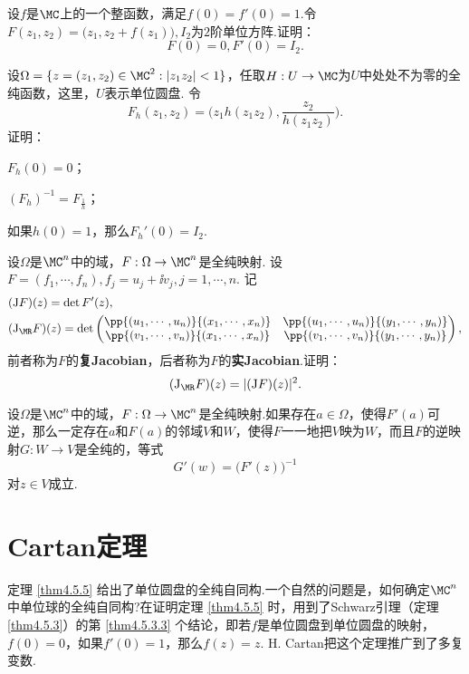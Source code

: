 \begin{xiti}\hypertarget{xiti9.4}{}
\item \hypertarget{xiti9.4.1}{} 设$f$是$\MC$上的一个整函数，满足$f(0)=f'(0)=1$.令$F(z_1,z_2)=\big(z_1,z_2+f(z_1)\big), I_2$为$2$阶单位方阵.证明：
    \[F(0)=0,F'(0)= I_2.\]
\item \hypertarget{xiti9.4.2}{} 设$\Omega=\{z=(z_1,z_2)\in\MC^2:|z_1z_2|<1\}$，任取$H:U\to\MC$为$U$中处处不为零的全纯函数，这里，$U$表示单位圆盘. 令
    \[F_h(z_1,z_2)=\bigg(z_1h(z_1z_2),\frac{z_2}{h(z_1z_2)}\bigg).\]
证明：
\begin{enuma}
   \item $F_h(0)=0$；
   \item $(F_h)^{-1}=F_{\frac1h}$；
   \item 如果$h(0)=1$，那么$F_h'(0)= I_2$.
\end{enuma}
\item 设$\Omega$是$\MC^n$中的域，$F:\Omega\to\MC^n$是全纯映射. 设$F=(f_1,\cdots,f_n),f_j=u_j+\ii v_j,j=1,\cdots,n$. 记
    \begin{align*}
    &(\textrm JF)(z)=\det F'(z),\\
    &(\textrm J_\MR F)(z)=\det\begin{pmatrix}
    \pp{(u_1,\cdots,u_n)}{(x_1,\cdots,x_n)}&\pp{(u_1,\cdots,u_n)}{(y_1,\cdots,y_n)}\\
    \pp{(v_1,\cdots,v_n)}{(x_1,\cdots,x_n)}&\pp{(v_1,\cdots,v_n)}{(y_1,\cdots,y_n)}
    \end{pmatrix},
    \end{align*}
前者称为$F$的\textbf{复Jacobian}，后者称为$F$的\textbf{实Jacobian}.证明：
\[(\textrm J_\MR F)(z)=|(\textrm JF)(z)|^2.\]
\item 设$\Omega$是$\MC^n$中的域，$F:\Omega\to \MC^n$是全纯映射.如果存在$a\in\Omega$，使得$F'(a)$可逆，那么一定存在$a$和$F(a)$的邻域$V$和$W$，使得$F$一一地把$V$映为$W$，而且$F$的逆映射$G:W\to V$是全纯的，等式
    \[G'(w)=\big(F'(z)\big)^{-1}\]
对$z\in V$成立.
\end{xiti}

\section{Cartan定理\label{sec9.5}}
定理 \ref{thm4.5.5} 给出了单位圆盘的全纯自同构.一个自然的问题是，如何确定$\MC^n$中单位球的全纯自同构?在证明定理 \ref{thm4.5.5} 时，用到了Schwarz引理（定理 \ref{thm4.5.3}）的第 \ref{thm4.5.3.3} 个结论，即若$f$是单位圆盘到单位圆盘的映射，$f(0)=0$，如果$f'(0)=1$，那么$f(z)=z$. H. Cartan把这个定理推广到了多复变数.

